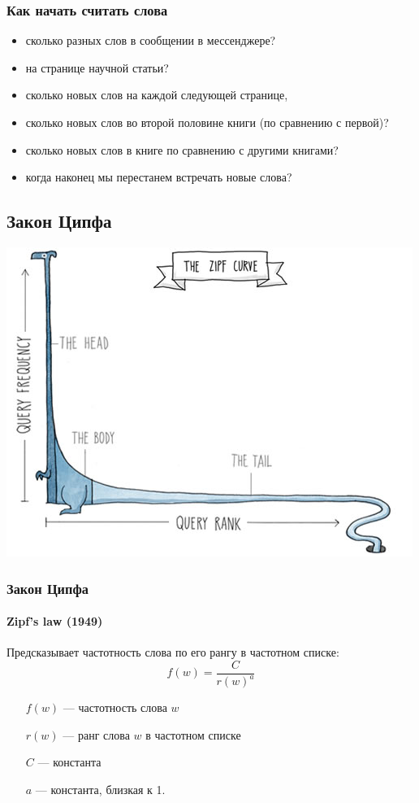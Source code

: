 \documentclass[svgnames]{beamer}
\begin{document}
\begin{frame}
  \frametitle{Как начать считать слова}
  \begin{itemize}[<+->]
  \item сколько разных слов в сообщении в
    мессенджере?
  \item на странице научной статьи?
  \item сколько новых слов на каждой следующей
  странице,
  \item сколько новых слов во второй половине книги (по
    сравнению с первой)?
  \item сколько новых слов в книге по сравнению
  с другими книгами? 
  \item когда наконец мы перестанем встречать новые слова?
  \end{itemize}
\end{frame}

\subsection{Закон Ципфа}

\begin{frame}[plain]
  \includegraphics[width=\textwidth]{zipf-animal}
\end{frame}

\begin{frame}
  \frametitle{Закон Ципфа}
  \framesubtitle{Zipf's law (1949)}
  Предсказывает частотность слова по его рангу в частотном списке:
    \begin{equation}
      f(w) = \frac{C}{r(w)^a}
    \end{equation}
    \begin{itemize}
    \item[$f(w)$] — частотность слова $w$
    \item[$r(w)$] — ранг слова $w$ в частотном списке
    \item[$C$] — константа
    \item[$a$] — константа, близкая к 1.
    \end{itemize}
\end{frame}
\end{document}
